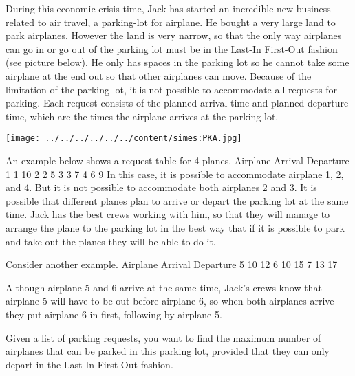 During this economic crisis time, Jack has started an incredible new business related to air travel, a parking-lot for airplane. He bought a very large land to park airplanes. However the land is very narrow, so that the only way airplanes can go in or go out of the parking lot must be in the Last-In First-Out fashion (see picture below). He only has spaces in the parking lot so he cannot take some airplane at the end out so that other airplanes can move. Because of the limitation of the parking lot, it is not possible to accommodate all requests for parking. Each request consists of the planned arrival time and planned departure time, which are the times the airplane arrives at the parking lot.


\texttt{[image: ../../../../../../content/simes:PKA.jpg]}

An example below shows a request table for 4 planes.
Airplane Arrival Departure
1 1 10
2 2 5
3 3 7
4 6 9
In this case, it is possible to accommodate airplane 1, 2, and 4. But it is not possible to accommodate both airplanes 2 and 3. It is possible that different planes plan to arrive or depart the parking lot at the same time. Jack has the best crews working with him, so that they will manage to arrange the plane to the parking lot in the best way that if it is possible to park and take out the planes they will be able to do it.

Consider another example.
Airplane Arrival Departure
5 10 12
6 10 15
7 13 17

Although airplane 5 and 6 arrive at the same time, Jack's crews know that airplane 5 will have to be out before airplane 6, so when both airplanes arrive they put airplane 6 in first, following by airplane 5.


Given a list of parking requests, you want to find the maximum number of airplanes that can be parked in this parking lot, provided that they can only depart in the Last-In First-Out fashion.